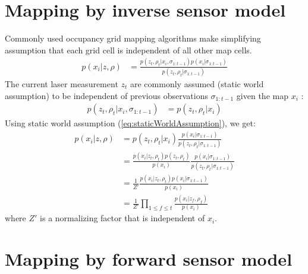 \documentclass[letterpaper, 10 pt, conference]{ieeeconf} %
\begin{document}
\section{Mapping by inverse sensor model}
Commonly used occupancy grid mapping algorithms make simplifying assumption
that each grid cell is independent of all other map cells. 
\begin{align}
  p(x_i|z, \rho) &= \frac{p(z_t, \rho_t|x_i, \sigma_{1:t-1})p(x_i|\sigma_{1:t-1})}
                         {p(z_t, \rho_t|\sigma_{1:t-1})}
\end{align}
The current laser measurement $z_t$ are commonly assumed (static world assumption) \cite{thrun2003learning} to be independent of previous observations $\sigma_{1:t-1}$ given the map $x_i$ :
\begin{align}
  p(z_t, \rho_t|x_i, \sigma_{1:t-1}) &= p(z_t, \rho_t|x_i)
 \label{eq:staticWorldAssumption}
\end{align}
Using static world assumption (\eqref{eq:staticWorldAssumption}), we get:
\begin{align}
 p(x_i|z, \rho) &= p(z_t, \rho_t|x_i)\frac{p(x_i|\sigma_{1:t-1})}
                                           {p(z_t, \rho_t|\sigma_{1:t-1})}\\
                 &= \frac{p(x_i|z_t, \rho_t)p(z_t,\rho_t)} {p(x_i)}\frac{p(x_i|\sigma_{1:t-1})}{p(z_t, \rho_t|\sigma_{1:t-1})}\\
                 &= \frac{1}{Z'}\frac{p(x_i|z_t, \rho_t)p(x_i|\sigma_{1:t-1})}{p(x_i)}\\
                 &= \frac{1}{Z'}\prod_{1\le f \le t} \frac{p(x_i|z_f, \rho_f)}{p(x_i)}
\end{align}
where $Z'$ is a normalizing factor that is independent of $x_i$.


\section{Mapping by forward sensor model}
\end{document}
